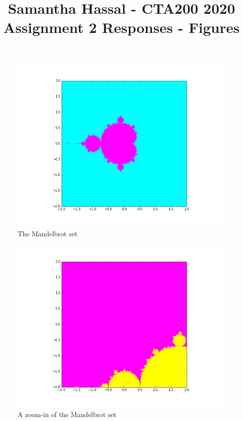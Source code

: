 \documentclass{article}
\title{Samantha Hassal - CTA200 2020 Assignment 2 Responses - Figures}
\date{}
\begin{document}
\begin{figure}
  \includegraphics[width=\linewidth]{Mandel_01.png}
  \caption{The Mandelbrot set}
  \label{fig:mandelbrot1}
\end{figure}

\begin{figure}
  \includegraphics[width=\linewidth]{Mandel_02.png}
  \caption{A zoom-in of the Mandelbrot set}
  \label{fig:mandelbrot2}
\end{figure}
\end{document}
